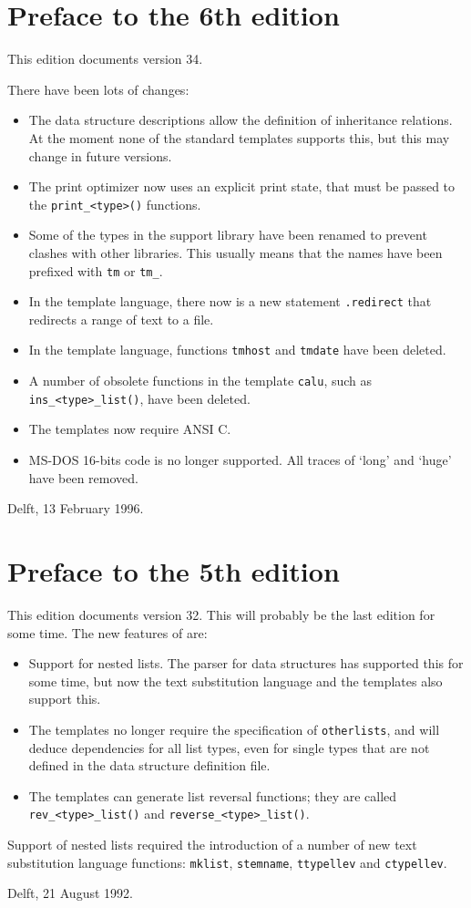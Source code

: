 \section{Preface to the 6th edition}
This edition documents {\Tm} version 34.
\par
There have been lots of changes:
\begin{itemize}
\item The data structure descriptions allow the definition of inheritance
      relations. At the moment none of the standard templates supports
      this, but this may change in future versions.
\item The print optimizer now uses an explicit print state, that must
      be passed to the \verb"print_<type>()" functions.
\item Some of the types in the {\C} support library have been
      renamed to prevent clashes with other libraries. This usually means
      that the names have been prefixed with \verb'tm' or \verb'tm_'.
\item In the template language, there now is a new statement \verb'.redirect'
      that redirects a range of text to a file.
\item In the template language, functions \verb'tmhost' and \verb'tmdate' 
      have been deleted.
\item A number of obsolete functions in the {\C} template \verb'calu', such as
      \verb"ins_<type>_list()", have been deleted.
\item The {\C} templates now require ANSI C.
\item MS-DOS 16-bits code is no longer supported. All traces of `long'
      and `huge' have been removed.
\end{itemize}
\begin{flushright}
Delft, 13 February 1996.
\end{flushright}
\section{Preface to the 5th edition}
This edition documents {\Tm} version 32.
This will probably be the last edition for some time. The new features
of {\Tm} are:
\begin{itemize}
\item Support for nested lists. The parser for data structures has
supported this for some time, but now the text substitution language
and the {\C} templates also support this.
\item The {\C} templates no longer require the specification of
{\tt otherlists}, and will deduce dependencies for all list types,
even for single types that are not defined in the data structure definition
file.
\item The {\C} templates can generate list reversal functions; they
      are called \verb+rev_<type>_list()+ and \verb+reverse_<type>_list()+.
\end{itemize}
Support of nested lists required the introduction of a number of new
{\Tm} text substitution language functions: \verb+mklist+, \verb+stemname+,
\verb+ttypellev+ and \verb+ctypellev+.
\begin{flushright}
Delft, 21 August 1992.
\end{flushright}
